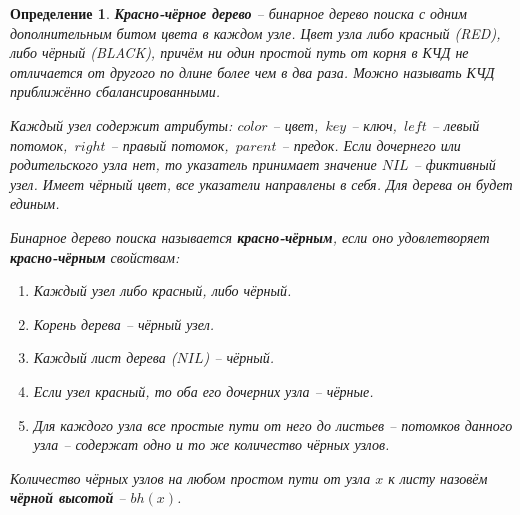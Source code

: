 \documentclass[a4paper,12pt]{article}
\newtheorem*{definition}{Определение}
\begin{document}
\begin{definition}
    \textbf{Красно-чёрное дерево} -- бинарное дерево поиска с одним дополнительным битом цвета в каждом узле. Цвет узла либо красный (RED), либо чёрный (BLACK), причём ни один простой путь от корня в КЧД не отличается от другого по длине более чем в два раза. Можно называть КЧД приближённо сбалансированными.
    
    Каждый узел содержит атрибуты: $color$ -- цвет,\ $key$ -- ключ,\ $left$ -- левый потомок,\ $right$ -- правый потомок,\ $parent$ -- предок. Если дочернего или родительского узла нет, то указатель принимает значение $NIL$ -- фиктивный узел. Имеет чёрный цвет, все указатели направлены в себя. Для дерева он будет единым.

    Бинарное дерево поиска называется \textbf{красно-чёрным}, если оно удовлетворяет \textbf{красно-чёрным} свойствам:
    \begin{enumerate}
        \item Каждый узел либо красный, либо чёрный.
        \item Корень дерева -- чёрный узел.
        \item Каждый лист дерева ($NIL$) -- чёрный.
        \item Если узел красный, то оба его дочерних узла -- чёрные.
        \item Для каждого узла все простые пути от него до листьев -- потомков данного узла -- содержат одно и то же количество чёрных узлов.
    \end{enumerate}
    
    Количество чёрных узлов на любом простом пути от узла $x$ к листу назовём \textbf{чёрной высотой} -- $bh(x)$.
\end{definition}
\end{document}
